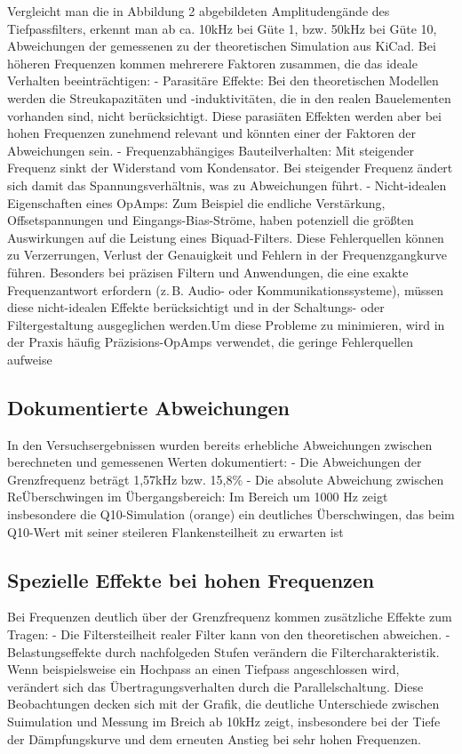 \documentclass[
  ngerman,
  letterpaper,
  DIV=11]{scrreprt}
\begin{document}
Vergleicht man die in Abbildung 2 abgebildeten Amplitudengände des
Tiefpassfilters, erkennt man ab ca. 10kHz bei Güte 1, bzw. 50kHz bei
Güte 10, Abweichungen der gemessenen zu der theoretischen Simulation aus
KiCad. Bei höheren Frequenzen kommen mehrerere Faktoren zusammen, die
das ideale Verhalten beeinträchtigen: - Parasitäre Effekte: Bei den
theoretischen Modellen werden die Streukapazitäten und -induktivitäten,
die in den realen Bauelementen vorhanden sind, nicht berücksichtigt.
Diese parasiäten Effekten werden aber bei hohen Frequenzen zunehmend
relevant und könnten einer der Faktoren der Abweichungen sein. -
Frequenzabhängiges Bauteilverhalten: Mit steigender Frequenz sinkt der
Widerstand vom Kondensator. Bei steigender Frequenz ändert sich damit
das Spannungsverhältnis, was zu Abweichungen führt. - Nicht-idealen
Eigenschaften eines OpAmps: Zum Beispiel die endliche Verstärkung,
Offsetspannungen und Eingangs-Bias-Ströme, haben potenziell die größten
Auswirkungen auf die Leistung eines Biquad-Filters. Diese Fehlerquellen
können zu Verzerrungen, Verlust der Genauigkeit und Fehlern in der
Frequenzgangkurve führen. Besonders bei präzisen Filtern und
Anwendungen, die eine exakte Frequenzantwort erfordern (z.\,B. Audio-
oder Kommunikationssysteme), müssen diese nicht-idealen Effekte
berücksichtigt und in der Schaltungs- oder Filtergestaltung ausgeglichen
werden.Um diese Probleme zu minimieren, wird in der Praxis häufig
Präzisions-OpAmps verwendet, die geringe Fehlerquellen aufweise

\subsection{Dokumentierte
Abweichungen}\label{dokumentierte-abweichungen}

In den Versuchsergebnissen wurden bereits erhebliche Abweichungen
zwischen berechneten und gemessenen Werten dokumentiert: - Die
Abweichungen der Grenzfrequenz beträgt 1,57kHz bzw. 15,8\% - Die
absolute Abweichung zwischen ReÜberschwingen im Übergangsbereich: Im
Bereich um 1000 Hz zeigt insbesondere die Q10-Simulation (orange) ein
deutliches Überschwingen, das beim Q10-Wert mit seiner steileren
Flankensteilheit zu erwarten ist

\subsection{Spezielle Effekte bei hohen
Frequenzen}\label{spezielle-effekte-bei-hohen-frequenzen}

Bei Frequenzen deutlich über der Grenzfrequenz kommen zusätzliche
Effekte zum Tragen: - Die Filtersteilheit realer Filter kann von den
theoretischen abweichen. - Belastungseffekte durch nachfolgeden Stufen
verändern die Filtercharakteristik. Wenn beispielsweise ein Hochpass an
einen Tiefpass angeschlossen wird, verändert sich das
Übertragungsverhalten durch die Parallelschaltung. Diese Beobachtungen
decken sich mit der Grafik, die deutliche Unterschiede zwischen
Suimulation und Messung im Breich ab 10kHz zeigt, insbesondere bei der
Tiefe der Dämpfungskurve und dem erneuten Anstieg bei sehr hohen
Frequenzen.
\end{document}
